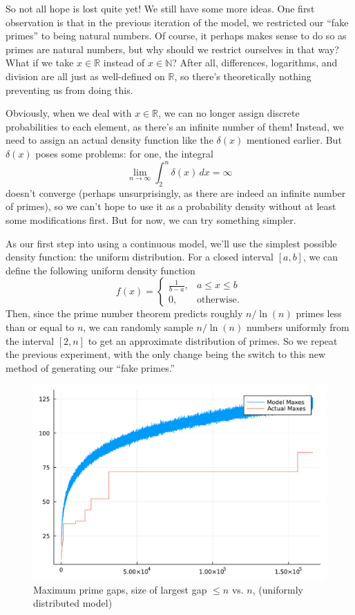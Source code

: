 \documentclass[conference]{IEEEtran}
\begin{document}
So not all hope is lost quite yet! We still have some more ideas.
One first observation is that in the previous iteration of the model,
we restricted our ``fake primes'' to being natural numbers. Of course,
it perhaps makes sense to do so as primes are natural numbers, but
why should we restrict ourselves in that way? What if we take $x \in \mathbb{R}$
instead of $x \in \mathbb{N}$? After all, differences, logarithms, and
division are all just as well-defined on $\mathbb{R}$, so there's theoretically
nothing preventing us from doing this.

Obviously, when we deal with $x \in \mathbb{R}$, we can
no longer assign discrete probabilities to each element,
as there's an infinite number of them! Instead, we need
to assign an actual density function like the $\delta(x)$
mentioned earlier. But $\delta(x)$ poses some problems:
for one, the integral
\[\lim_{n \to \infty} \int_2^n \delta(x)\, dx = \infty\]
doesn't converge (perhaps unsurprisingly, as there are
indeed an infinite number of primes), so we can't hope to
use it as a probability density without at least some
modifications first. But for now, we can try something
simpler.

As our first step into using a continuous model, we'll
use the simplest possible density function: the uniform
distribution. For a closed interval $[a, b]$, we can
define the following uniform density function
\[f(x) = \begin{cases}\frac{1}{b-a}, & a \le x \le b \\ 0, & \text{otherwise}.\end{cases}\]
Then, since the prime number theorem predicts roughly
$n/\ln(n)$ primes less than or equal to $n$, we can
randomly sample $n/\ln(n)$ numbers uniformly from the
interval $[2, n]$ to get an approximate distribution of
primes. So we repeat the previous experiment, with the
only change being the switch to this new method of
generating our ``fake primes.''

\begin{figure}[H]
  \centering
  \includegraphics[width=\linewidth,keepaspectratio]{random-plot-with-reals.pdf}
  \caption{Maximum prime gaps, size of largest gap $\le n$ vs. $n$, (uniformly distributed model)}
\end{figure}
\end{document}
